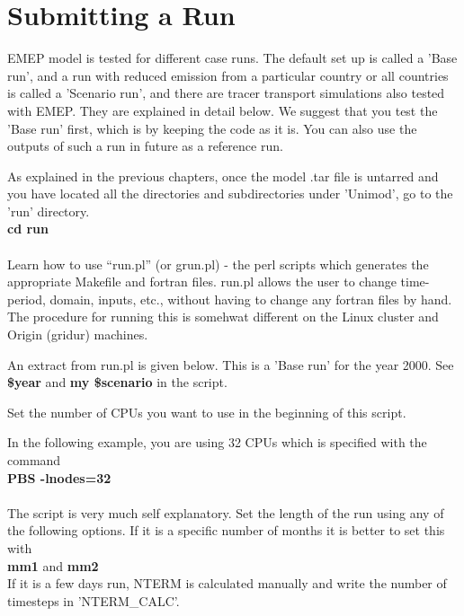 \chapter{Submitting a Run}

EMEP model is tested for different case runs.  The default set  up is
called a 'Base run', and a run with reduced emission from a particular
country or all countries is called a 'Scenario run', and there are
tracer transport simulations also tested with EMEP.  They are
explained in detail below.  We suggest that you test the 'Base run'
first, which is by keeping the code as it is.  You can also use the
outputs of such a run in future as a reference run.  

As explained in the previous chapters, once the model .tar file is
untarred and you have located all the directories and subdirectories
under 'Unimod',  go to the 'run' directory. \\

\textbf{cd run} \\
\\


Learn how to use ``run.pl'' (or grun.pl) - the perl scripts which generates
the appropriate Makefile and fortran files. run.pl allows
the user to change time-period, domain, inputs, etc., without
having to change any fortran files by hand. The procedure for running
this is somehwat different on the Linux cluster and  Origin (gridur)
machines.

An extract from run.pl  is given below.  This is a 'Base run' for the year
2000. See \textbf{\$year} and \textbf{my \$scenario} in the script. 

 Set the number of CPUs you
want to use in the beginning of this script. 

In the following example, you are using 32 CPUs which is specified
with the command \\

\textbf{PBS -lnodes=32} \\
\\

The script is very much self explanatory.  Set the length of the run
using any of the following options.  If it is a specific number of months it
is better to set this with \\

\textbf{mm1} and \textbf{mm2}\\


If it is a few days run, NTERM is calculated manually and write the
number of timesteps in 'NTERM\_CALC'.  \\

